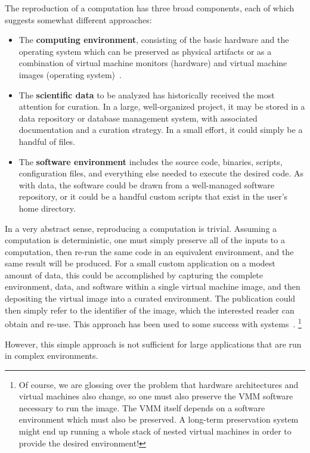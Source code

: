 \documentclass{sig-alternate}
\begin{document}
The reproduction of a computation has three broad components,
each of which suggests somewhat different approaches:

\begin{itemize}
\item The {\bf computing environment}, consisting of the basic hardware and the operating system which can be preserved as physical artifacts or as a combination of virtual machine monitors (hardware) and virtual machine images (operating system)~\cite{matthews2009towards}.
\item The {\bf scientific data} to be analyzed has historically received the most attention for curation.  In a large, well-organized project, it may be stored in a  data repository or database management system, with associated documentation and a curation strategy.  In a small effort, it could simply be a handful of files.
\item The {\bf software environment} includes the source code, binaries, scripts, configuration files, and everything else needed to execute the desired code.  As with data, the software could be drawn from a well-managed software repository, or it could be a handful custom scripts that exist in the user's home directory.
\end{itemize}

In a very abstract sense, reproducing a computation is trivial.
Assuming a computation is deterministic, one must simply
preserve all of the inputs to a computation, then re-run
the same code in an equivalent environment, and the same result
will be produced.  For a small custom application on a modest
amount of data, this could be accomplished by capturing the
complete environment,
data, and software within a single virtual machine image,
and then depositing the virtual
image into a curated environment.  The publication could
then simply refer to the identifier of the image, which the
interested reader can obtain and re-use. This approach has
been used to some success with systems~\cite{castagne2013consider}.
\footnote{Of course, we are glossing over the problem that hardware
architectures and virtual machines also change, so one must also
preserve the VMM software necessary to run the image.  The VMM itself
depends on a software environment which must also be preserved.
A long-term preservation system might end up running a whole
stack of nested virtual machines in order to provide the desired
environment! }

However, this simple approach is not sufficient for large applications
that are run in complex environments.
\end{document}

